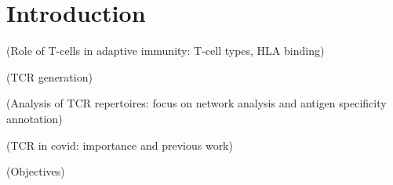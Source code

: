 \chapter{Introduction}

(Role of T-cells in adaptive immunity: T-cell types, HLA binding)

(TCR generation)

(Analysis of TCR repertoires: focus on network analysis and antigen specificity annotation)

(TCR in covid: importance and previous work)

(Objectives)
